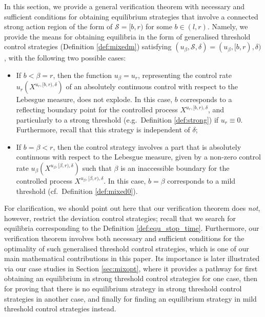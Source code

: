 \documentclass[11pt]{article} %
\numberwithin{komcounter}{section}
\begin{document}
In this section, we provide a general verification theorem with necessary and sufficient conditions for obtaining equilibrium strategies that involve a connected strong action region of the form of $\mathcal{S}=[b,r)$ for some $b\in (l,r)$. 
Namely, we  provide the means for obtaining equilibria in the form of generalised threshold control strategies (Definition \ref{def:mixedm}) satisfying $(u_\beta, \mathcal{S}, \delta)=(u_\beta, [b,r), \delta)$, with the following two possible cases:
\begin{itemize}
\vspace{-2mm}
\item If $b<\beta =r$, then the function $u_{\beta}=u_r$, representing the control rate $u_r(X^{u_r, [b,r),\delta})$ of an absolutely continuous control with respect to the Lebesgue measure, does not explode. In this case, $b$ corresponds to a reflecting boundary point for the controlled process $X^{u_r,[b,r),\delta}$, and particularly to a strong threshold (e.g.\ Definition \ref{def:strong}) if $u_r \equiv 0$. Furthermore, recall that this strategy is independent of $\delta$;

\vspace{-2mm}
\item If $b=\beta<r$, then the control strategy involves a part that is absolutely continuous with respect to the Lebesgue measure, given by a non-zero control rate $u_\beta(X^{u_\beta, [\beta,r),\delta})$ such that $\beta$ is an inaccessible boundary for the controlled process $X^{u_\beta, [\beta,r),\delta}$. In this case, $b=\beta$ corresponds to a mild threshold (cf.\ Definition \ref{def:mixed0}). 
\end{itemize}
\vspace{-1mm}
For clarification, we should point out here that our verification theorem does \textit{not}, however, restrict the deviation control strategies; recall that we search for equilibria corresponding to the Definition \ref{def:equ_stop_time}. Furthermore, our verification theorem involves both necessary and sufficient conditions for the optimality of such generalised threshold control strategies, which is one of our main mathematical contributions in this paper. 
Its importance is later illustrated via our case studies in Section \ref{sec:mixopt}, where it provides a pathway for first obtaining an equilibrium in strong threshold control strategies for one case, then for proving that there is no equilibrium strategy in strong threshold control strategies in another case, and finally for finding an equilibrium strategy in mild threshold control strategies instead. 
\end{document}
